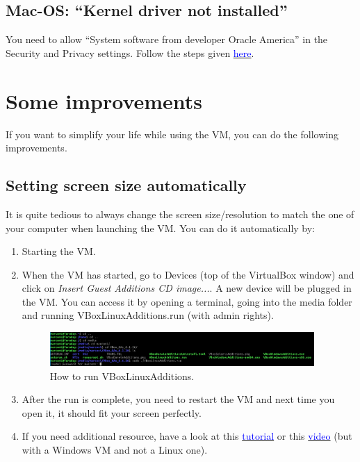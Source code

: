 \documentclass[a4paper,11pt]{article}
\begin{document}
\subsection*{Mac-OS: ``Kernel driver not installed''}
You need to allow ``System software from developer Oracle America'' in the Security and Privacy settings. Follow the steps given \href{https://medium.com/@Aenon/mac-virtualbox-kernel-driver-error-df39e7e10cd8}{\textcolor{blue}{here}}.

\section{Some improvements}
If you want to simplify your life while using the VM, you can do the following improvements.
\subsection*{Setting screen size automatically}
It is quite tedious to always change the screen size/resolution to match the one of your computer when launching the VM. You can do it automatically by:
\begin{enumerate}
\item Starting the VM.
\item When the VM has started, go to Devices (top of the VirtualBox window) and click on \textit{Insert Guest Additions CD image...}. A new device will be plugged in the VM. You can access it by opening a terminal, going into the media folder and running VBoxLinuxAdditions.run (with admin rights).
\begin{figure}[H]
    \centering
    \includegraphics[width=0.95\textwidth]{figs/run_VBOX.PNG}
	\caption{How to run VBoxLinuxAdditions.}
	\label{figrun}
\end{figure}
\item After the run is complete, you need to restart the VM and next time you open it, it should fit your screen perfectly.
\item If you need additional resource, have a look at this \href{https://www.howtogeek.com/howto/2845/install-guest-additions-to-windows-and-linux-vms-in-virtualbox/}{\textcolor{blue}{tutorial}} or this \href{https://www.youtube.com/watch?v=YRK8jtP3B60}{\textcolor{blue}{video}} (but with a Windows VM and not a Linux one).
\end{enumerate}
\end{document}
